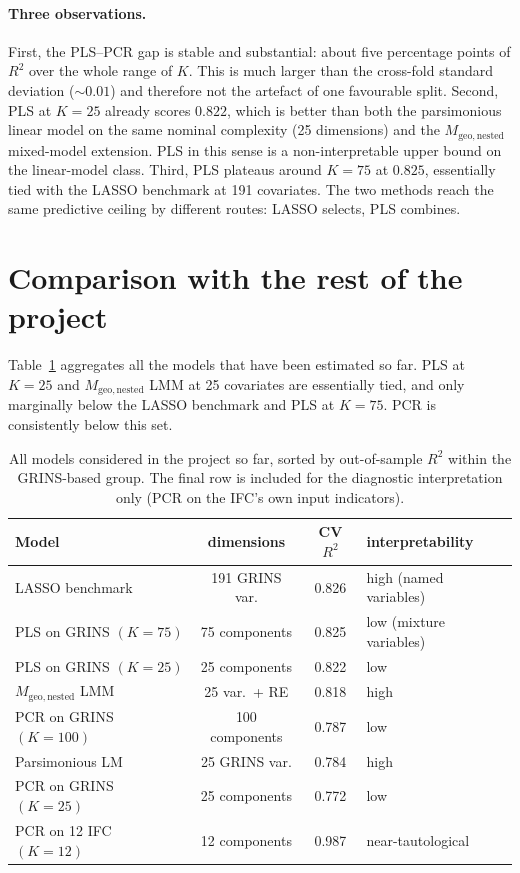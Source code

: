 \documentclass[11pt,a4paper]{article}
\begin{document}
\paragraph{Three observations.}
First, the PLS--PCR gap is stable and substantial: about five
percentage points of \(R^{2}\) over the whole range of \(K\). This
is much larger than the cross-fold standard deviation
(\(\sim 0.01\)) and therefore not the artefact of one favourable
split. Second, PLS at \(K = 25\) already scores \(0.822\), which
is better than both the parsimonious linear model on the same
nominal complexity (25 dimensions) and the \(M_{\mathrm{geo,
nested}}\) mixed-model extension. PLS in this sense is a
non-interpretable upper bound on the linear-model class. Third,
PLS plateaus around \(K = 75\) at \(0.825\), essentially tied with
the LASSO benchmark at 191 covariates. The two methods reach the
same predictive ceiling by different routes: LASSO selects, PLS
combines.

\section{Comparison with the rest of the project}

Table~\ref{tab:all} aggregates all the models that have been
estimated so far. PLS at \(K=25\) and \(M_{\mathrm{geo,nested}}\)
LMM at 25 covariates are essentially tied, and only marginally
below the LASSO benchmark and PLS at \(K=75\). PCR is consistently
below this set.

\begin{table}[h!]
  \centering
  \begin{tabular}{l c c l}
    \toprule
    Model & dimensions & CV \(R^{2}\) & interpretability \\
    \midrule
    LASSO benchmark              & 191 GRINS var.  & 0.826 & high (named variables) \\
    PLS on GRINS \((K = 75)\)    & 75 components   & 0.825 & low (mixture variables) \\
    PLS on GRINS \((K = 25)\)    & 25 components   & 0.822 & low \\
    \(M_{\mathrm{geo,nested}}\) LMM & 25 var.\ + RE & 0.818 & high \\
    PCR on GRINS \((K = 100)\)   & 100 components  & 0.787 & low \\
    Parsimonious LM              & 25 GRINS var.   & 0.784 & high \\
    PCR on GRINS \((K = 25)\)    & 25 components   & 0.772 & low \\
    PCR on 12 IFC \((K = 12)\)   & 12 components   & 0.987 & near-tautological \\
    \bottomrule
  \end{tabular}
  \caption{All models considered in the project so far, sorted by
    out-of-sample \(R^{2}\) within the GRINS-based group. The
    final row is included for the diagnostic interpretation only
    (PCR on the IFC's own input indicators).}
  \label{tab:all}
\end{table}
\end{document}
